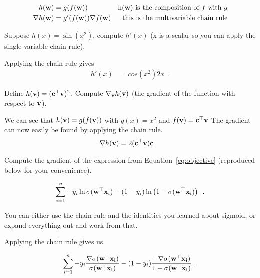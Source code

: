 \documentclass[assignment04_Solutions]{subfiles}
\begin{document}
\begin{align}
h(\mathbf{w}) &= g(f(\mathbf{w}))&\mbox{h($\mathbf{w}$) is the composition of $f$ with $g$} \nonumber \\
\nabla h(\mathbf{w}) &= g'(f(\mathbf{w})) \nabla f(\mathbf{w}) & \mbox{this is the multivariable chain rule}
\end{align}

\begin{exercise}[(60 minutes)]
\bes
\item Suppose $h(x) = \sin(x^2)$, compute $h'(x)$ (x is a scalar so you can apply the single-variable chain rule).

\begin{boxedsolution}

Applying the chain rule gives
\begin{align}
h'(x) &= cos(x^2) 2x \enspace .
\end{align}
\end{boxedsolution}

\item Define $h(\mathbf{v}) = (\mathbf{c}^\top \mathbf{v})^2$.  Compute $\nabla_{\mathbf{v}} h(\mathbf{v})$ (the gradient of the function with respect to $\mathbf{v}$).

\begin{boxedsolution}
We can see that $h(\mathbf{v}) = g(f(\mathbf{v}))$ with $g(x) = x^2$ and $f(\mathbf{v}) = \mathbf{c}^\top \mathbf{v}$ The gradient can now easily be found by applying the chain rule.
\begin{align}
\nabla h(\mathbf{v}) &= 2(\mathbf{c}^\top \mathbf{v}) \mathbf{c}
\end{align}
\end{boxedsolution}

\item Compute the gradient of the expression from Equation~\ref{eq:objective} (reproduced below for your convenience).

\begin{align}
 \sum_{i=1}^n -y_i \ln \sigma( \mathbf{w}^\top \mathbf{x_i}) - (1-y_i) \ln  \left (1 - \sigma( \mathbf{w}^\top \mathbf{x_i}) \right ) \enspace .
\end{align}

You can either use the chain rule and the identities you learned about sigmoid, or expand everything out and work from that.

\begin{boxedsolution}
Applying the chain rule gives us

\begin{align}
 \sum_{i=1}^n -y_i \frac{\nabla \sigma( \mathbf{w}^\top \mathbf{x_i})}{\sigma( \mathbf{w}^\top \mathbf{x_i})} - (1-y_i) \frac{- \nabla \sigma( \mathbf{w}^\top \mathbf{x_i})}{1 - \sigma( \mathbf{w}^\top \mathbf{x_i})}  \enspace .
\end{align}


\end{boxedsolution}
\end{exercise}
\end{document}
